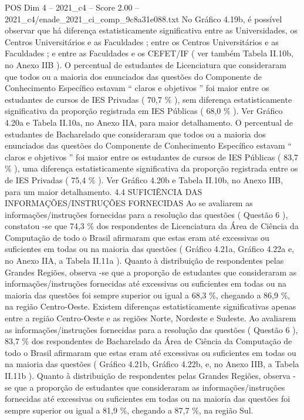 \begin{textsample}{POS Dim 4 – 2021\_c4 – Score 2.00 – 2021\_c4/enade\_2021\_ci\_comp\_9c8a31e088.txt}
No Gráfico 4.19b, é possível observar que há diferença estatisticamente significativa entre as Universidades, os Centros Universitários e as Faculdades ; entre os Centros Universitários e as Faculdades ; e entre as Faculdades e os CEFET/IF ( ver também Tabela II.10b, no Anexo IIB ).
O percentual de estudantes de Licenciatura que consideraram que todos ou a maioria dos enunciados das questões do Componente de Conhecimento Específico estavam “ claros e objetivos ” foi maior entre os estudantes de cursos de IES Privadas ( 70,7 \% ), sem diferença estatisticamente significativa da proporção registrada em IES Públicas ( 68,0 \% ).
Ver Gráfico 4.20a e Tabela II.10a, no Anexo IIA, para maior detalhamento.
O percentual de estudantes de Bacharelado que consideraram que todos ou a maioria dos enunciados das questões do Componente de Conhecimento Específico estavam “ claros e objetivos ” foi maior entre os estudantes de cursos de IES Públicas ( 83,7 \% ), uma diferença estatisticamente significativa da proporção registrada entre os de IES Privadas ( 75,4 \% ).
Ver Gráfico 4.20b e Tabela II.10b, no Anexo IIB, para um maior detalhamento. 4.4 SUFICIÊNCIA DAS INFORMAÇÕES/INSTRUÇÕES FORNECIDAS Ao se avaliarem as informações/instruções fornecidas para a resolução das questões ( Questão 6 ), constatou -se que 74,3 \% dos respondentes de Licenciatura da Área de Ciência da Computação de todo o Brasil afirmaram que estas eram até excessivas ou suficientes em todas ou na maioria das questões ( Gráfico 4.21a, Gráfico 4.22a e, no Anexo IIA, a Tabela II.11a ).
Quanto à distribuição de respondentes pelas Grandes Regiões, observa -se que a proporção de estudantes que consideraram as informações/instruções fornecidas até excessivas ou suficientes em todas ou na maioria das questões foi sempre superior ou igual a 68,3 \%, chegando a 86,9 \%, na região Centro-Oeste.
Existem diferenças estatisticamente significativas apenas entre a região Centro-Oeste e as regiões Norte, Nordeste e Sudeste.
Ao avaliarem as informações/instruções fornecidas para a resolução das questões ( Questão 6 ), 83,7 \% dos respondentes de Bacharelado da Área de Ciência da Computação de todo o Brasil afirmaram que estas eram até excessivas ou suficientes em todas ou na maioria das questões ( Gráfico 4.21b, Gráfico 4.22b, e, no Anexo IIB, a Tabela II.11b ).
Quanto à distribuição de respondentes pelas Grandes Regiões, observa -se que a proporção de estudantes que consideraram as informações/instruções fornecidas até excessivas ou suficientes em todas ou na maioria das questões foi sempre superior ou igual a 81,9 \%, chegando a 87,7 \%, na região Sul.

\end{textsample}
